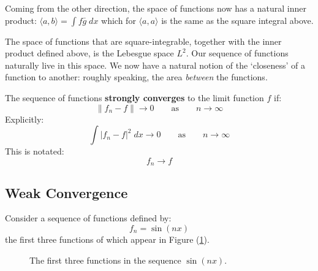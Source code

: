 \documentclass[12pt, a4paper, twoside, openright]{book}
\begin{document}
Coming from the other direction, the space of functions now has a natural inner product: $ \langle a,b \rangle = \int f \bar{g}\; dx $ which for $\langle a,a \rangle$ is the same as the square integral above.

The space of functions that are square-integrable, together with the inner product defined above, is the Lebesgue space $L^2$.  Our sequence of functions naturally live in this space.  We now have a natural notion of the `closeness' of a function to another: roughly speaking, the area \emph{between} the functions.

The sequence of functions \textbf{strongly converges} to the limit function $f$ if:
\begin{equation}
\lVert f_n - f \rVert \to 0 \qquad \text{as} \qquad n \to \infty
\end{equation}
Explicitly:
\begin{equation}
\int \lvert f_n - f \rvert^2 \;dx  \to 0 \qquad \text{as} \qquad n \to \infty
\end{equation}
This is notated:
\begin{equation}
f_n \to f
\end{equation}


\clearpage
\subsection{Weak Convergence}

Consider a sequence of functions defined by:
\begin{equation}
f_n = \sin(n x)
\end{equation}
the first three functions of which appear in Figure (\ref{sinnx_c}).
\begin{figure}[ht]
\centering
{}
\caption{The first three functions in the sequence $\sin (n x)$.}\label{sinnx_c}
\end{figure}
\end{document}
